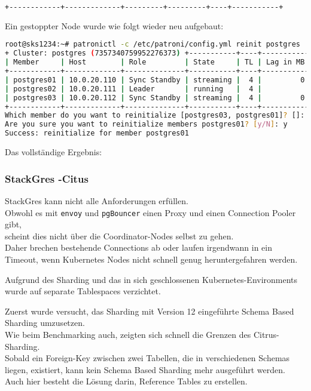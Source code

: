 \begin{flushleft}
\begin{lstlisting}[language=bash, caption=Patroni - Testing - Switchover,captionpos=b,label={lst:testing_patroni_switchover},breaklines=true]
+------------+-------------+---------+---------+----+-----------+
\end{lstlisting}
    Ein gestoppter Node wurde wie folgt wieder neu aufgebaut:
\lstset{style=gra_codestyle}
\begin{lstlisting}[language=bash, caption=Patroni - Testing - Reinit,captionpos=b,label={lst:testing_patroni_reinit},breaklines=true]
root@sks1234:~# patronictl -c /etc/patroni/config.yml reinit postgres
+ Cluster: postgres (7357340759952276373) +-----------+----+-----------+
| Member     | Host        | Role         | State     | TL | Lag in MB |
+------------+-------------+--------------+-----------+----+-----------+
| postgres01 | 10.0.20.110 | Sync Standby | streaming |  4 |         0 |
| postgres02 | 10.0.20.111 | Leader       | running   |  4 |           |
| postgres03 | 10.0.20.112 | Sync Standby | streaming |  4 |         0 |
+------------+-------------+--------------+-----------+----+-----------+
Which member do you want to reinitialize [postgres03, postgres01]? []: postgres01
Are you sure you want to reinitialize members postgres01? [y/N]: y
Success: reinitialize for member postgres01
\end{lstlisting}
    Das vollständige Ergebnis:
    
\end{flushleft}
\begin{flushleft}
    \subsubsection{StackGres -Citus}
    StackGres kann nicht alle Anforderungen erfüllen.\\
    Obwohl es mit \texttt{envoy} und \texttt{pgBouncer} einen Proxy und einen Connection Pooler gibt,\\
    scheint dies nicht über die Coordinator-Nodes selbst zu gehen.\\
    Daher brechen bestehende Connections ab oder laufen irgendwann in ein Timeout, wenn \Gls{Kubernetes} Nodes nicht schnell genug heruntergefahren werden.
\end{flushleft}
\begin{flushleft}
    Aufgrund des Sharding und das in sich geschlossenen \Gls{Kubernetes}-Environments wurde auf separate Tablespaces verzichtet.
\end{flushleft}
\begin{flushleft}
    Zuerst wurde versucht, das Sharding mit Version 12 eingeführte Schema Based Sharding umzusetzen.\\
    Wie beim Benchmarking auch, zeigten sich schnell die Grenzen des Citrus-Sharding.\\
    Sobald ein Foreign-Key zwischen zwei Tabellen, die in verschiedenen Schemas liegen, existiert, kann kein Schema Based Sharding mehr ausgeführt werden.\\
    Auch hier besteht die Lösung darin, Reference Tables zu erstellen.
\end{flushleft}
